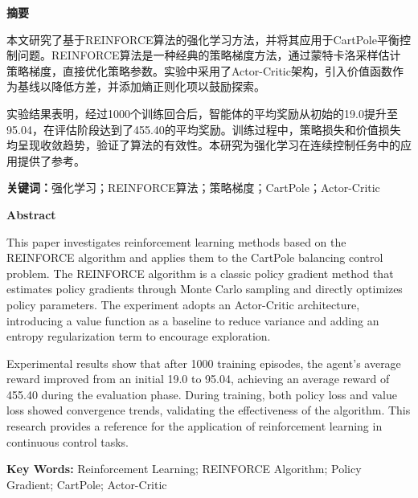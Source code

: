 \documentclass[12pt,a4paper]{article}
\begin{document}
\begin{center}
{\bfseries\fontsize{18pt}{\baselineskip}\selectfont 摘要}
\end{center}
\vspace{18pt}

\setlength{\parskip}{0pt}

本文研究了基于REINFORCE算法的强化学习方法，并将其应用于CartPole平衡控制问题。REINFORCE算法是一种经典的策略梯度方法，通过蒙特卡洛采样估计策略梯度，直接优化策略参数。实验中采用了Actor-Critic架构，引入价值函数作为基线以降低方差，并添加熵正则化项以鼓励探索。

实验结果表明，经过1000个训练回合后，智能体的平均奖励从初始的19.0提升至95.04，在评估阶段达到了455.40的平均奖励。训练过程中，策略损失和价值损失均呈现收敛趋势，验证了算法的有效性。本研究为强化学习在连续控制任务中的应用提供了参考。

\vspace{12pt}
\noindent\textbf{关键词：}强化学习；REINFORCE算法；策略梯度；CartPole；Actor-Critic

\vspace{24pt}

\begin{center}
{\bfseries\fontsize{18pt}{\baselineskip}\selectfont Abstract}
\end{center}
\vspace{18pt}

This paper investigates reinforcement learning methods based on the REINFORCE algorithm and applies them to the CartPole balancing control problem. The REINFORCE algorithm is a classic policy gradient method that estimates policy gradients through Monte Carlo sampling and directly optimizes policy parameters. The experiment adopts an Actor-Critic architecture, introducing a value function as a baseline to reduce variance and adding an entropy regularization term to encourage exploration.

Experimental results show that after 1000 training episodes, the agent's average reward improved from an initial 19.0 to 95.04, achieving an average reward of 455.40 during the evaluation phase. During training, both policy loss and value loss showed convergence trends, validating the effectiveness of the algorithm. This research provides a reference for the application of reinforcement learning in continuous control tasks.

\vspace{12pt}
\noindent\textbf{Key Words:} Reinforcement Learning; REINFORCE Algorithm; Policy Gradient; CartPole; Actor-Critic
\end{document}
